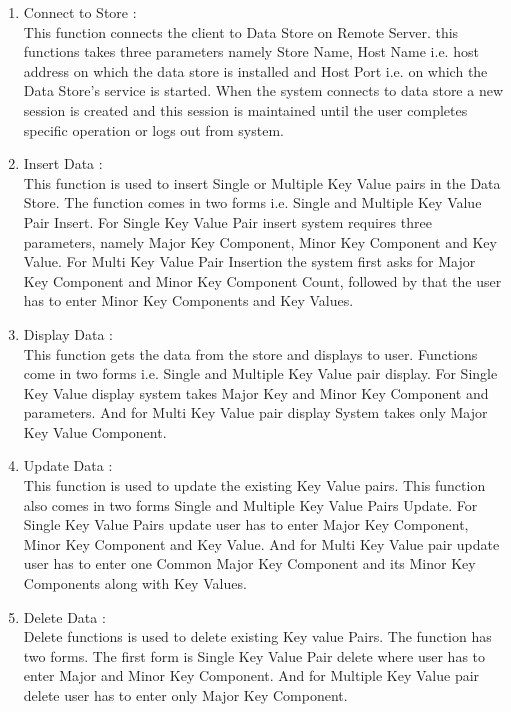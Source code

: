 \begin{enumerate}
  \item Connect to Store : \\
\hspace*{0.7in} This function connects the client to Data Store on Remote Server. this functions takes three parameters namely Store Name, Host Name i.e. host address on which the data store is installed and Host Port i.e. on which the Data Store's service is started. When the system connects to data store a new session is created and this session is maintained until the user completes specific operation or logs out from system.

  \item Insert Data : \\
\hspace*{0.7in} This function is used to insert Single or Multiple Key Value pairs in the Data Store. The function comes in two forms i.e. Single and Multiple Key Value Pair Insert. For Single Key Value Pair insert system requires three parameters, namely Major Key Component, Minor Key Component and Key Value. For Multi Key Value Pair Insertion the system first asks for Major Key Component and Minor Key Component Count, followed by that the user has to enter Minor Key Components and Key Values.

  \item Display Data : \\
\hspace*{0.7in} This function gets the data from the store and displays to user. Functions come in two forms i.e. Single and Multiple Key Value pair display. For Single Key Value display system takes Major Key and Minor Key Component and parameters. And for Multi Key Value pair display System takes only Major Key Value Component.

  \item Update Data : \\
\hspace*{0.7in} This function is used to update the existing Key Value pairs. This function also comes in two forms Single and Multiple Key Value Pairs Update. For Single Key Value Pairs update user has to enter Major Key Component, Minor Key Component and Key Value. And for Multi Key Value pair update user has to enter one Common Major Key Component and its Minor Key Components along with Key Values.

  \item Delete Data : \\
\hspace*{0.7in} Delete functions is used to delete existing Key value Pairs. The function has two forms. The first form is Single Key Value Pair delete where user has to enter Major and Minor Key Component. And for Multiple Key Value pair delete user has to enter only Major Key Component.


\end{enumerate}

